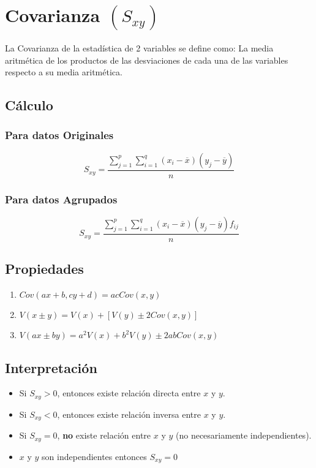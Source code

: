 \section{Covarianza $(S_{xy})$}
La Covarianza de la estadística de 2 variables se define como: La media aritmética de los productos de las desviaciones de cada una de las variables respecto a su media aritmética.
\subsection{Cálculo}
\subsubsection{Para datos Originales}
$$S_{xy}=\dfrac{\displaystyle{\sum_{j=1}^{p}\sum_{i=1}^{q}}(x_i-\overline{x})(y_j-\overline{y}) }{n}$$
\subsubsection{Para datos Agrupados}
$$S_{xy}=\dfrac{\displaystyle{\sum_{j=1}^{p}\sum_{i=1}^{q}}(x_i-\overline{x})(y_j-\overline{y})f_{ij} }{n}$$
\subsection{Propiedades}
\begin{enumerate}
\item $Cov(ax+b,cy+d)=ac Cov(x,y)$
\item $V(x\pm y)=V(x)+[V(y)\pm 2Cov(x,y)]$
\item $V(ax\pm by)=a^2V(x)+b^2V(y)\pm 2abCov(x,y)$
\end{enumerate}
\subsection{Interpretación}
\begin{itemize}
\item Si $S_{xy}>0$, entonces existe relación directa entre $x$ y $y$.
\item Si $S_{xy}<0$, entonces existe relación inversa entre $x$ y $y$.
\item Si $S_{xy}=0$, \textbf{no} existe relación entre $x$ y $y$ (no necesariamente independientes).
\item $x$ y $y$ son independientes entonces $S_{xy}=0$
\end{itemize}